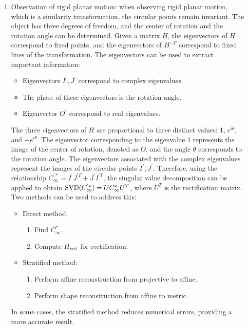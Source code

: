 \begin{enumerate}
    \item Observation of rigid planar motion: when observing rigid planar motion, which is a similarity transformation, the circular points remain invariant.
        The object has three degrees of freedom, and the center of rotation and the rotation angle can be determined.
        Given a matrix $H$, the eigenvectors of $H$ correspond to fixed points, and the eigenvectors of $H^{-T}$ correspond to fixed lines of the transformation.
        The eigenvectors can be used to extract important information:
        \begin{itemize}
            \item Eigenvectors $I^{'},J^{'}$ correspond to complex eigenvalues. 
            \item The phase of these eigenvectors is the rotation angle.
            \item Eigenvector $O^{'}$ correspond to real eigenvalues. 
        \end{itemize}
        The three eigenvectors of $H$ are proportional to three distinct values: 1, $e^{i\theta}$, and $-e^{i\theta}$.
        The eigenvector corresponding to the eigenvalue 1 represents the image of the center of rotation, denoted as $O$, and the angle $\theta$ corresponds to the rotation angle. 
        The eigenvectors associated with the complex eigenvalues represent the images of the circular points $I^{'},J^{'}$. 
        Therefore, using the relationship $C_{\infty}^{'*}=I^{'}J^{'T}+J^{'}I^{'T}$, the singular value decomposition can be applied to obtain $\textnormal{SVD}(C_{\infty}^{'*})=UC_{\infty}^{*}U^T$, where $U^T$ is the rectification matrix. 
        Two methods can be used to address this:
        \begin{itemize}
            \item Direct method: 
                \begin{enumerate}
                    \item Find $C_{\infty}^{*'}$. 
                    \item Compute $H_{rect}$ for rectification. 
                \end{enumerate}
            \item Stratified method: 
                \begin{enumerate}
                    \item Perform affine reconstruction from projective to affine.
                    \item Perform shape reconstruction from affine to metric.
                \end{enumerate}
        \end{itemize}
        In some cases, the stratified method reduces numerical errors, providing a more accurate result.
\end{enumerate}